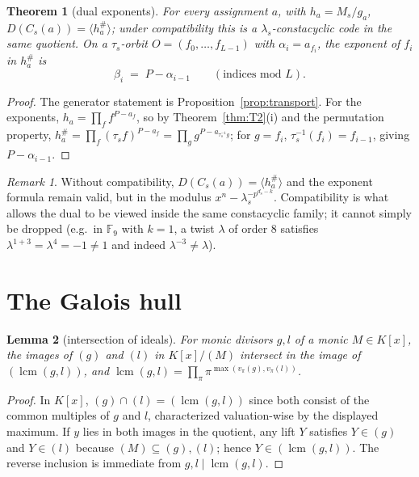 \documentclass[11pt]{article}
\newtheorem{theorem}{Theorem}[section]
\newtheorem{lemma}[theorem]{Lemma}
\theoremstyle{definition}
\theoremstyle{remark}
\newtheorem*{remark}{Remark}
\newcommand{\lcm}{\operatorname{lcm}}
\begin{document}
\begin{theorem}[dual exponents]\label{thm:T3}
For every assignment \(a\), with \(h_a = M_s / g_a\),
\(D(C_s(a)) = \langle h_a^{\#} \rangle\); under compatibility this is a
\(\lambda_s\)-constacyclic code in the same quotient. On a
\(\tau_s\)-orbit \(O = (f_0,\dots,f_{L-1})\) with \(\alpha_i = a_{f_i}\),
the exponent of \(f_i\) in \(h_a^{\#}\) is
\[
\beta_i \;=\; P - \alpha_{i-1} \qquad (\text{indices mod } L).
\]
\end{theorem}

\begin{proof}
The generator statement is Proposition~\ref{prop:transport}. For the
exponents, \(h_a = \prod_{f} f^{P - a_f}\), so by Theorem~\ref{thm:T2}(i)
and the permutation property,
\(h_a^{\#} = \prod_f (\tau_s f)^{P-a_f} = \prod_{g} g^{P - a_{\tau_s^{-1} g}}\);
for \(g = f_i\), \(\tau_s^{-1}(f_i) = f_{i-1}\), giving \(P - \alpha_{i-1}\).
\end{proof}

\begin{remark}
Without compatibility, \(D(C_s(a)) = \langle h_a^{\#}\rangle\) and the
exponent formula remain valid, but in the modulus
\(x^n - \lambda_s^{-p^{d_s-k}}\). Compatibility is what allows the dual
to be viewed inside the same constacyclic family; it cannot simply be
dropped (e.g.\ in \(\mathbb{F}_9\) with \(k=1\), a twist \(\lambda\) of
order \(8\) satisfies \(\lambda^{1+3} = \lambda^4 = -1 \ne 1\) and indeed
\(\lambda^{-3} \ne \lambda\)).
\end{remark}

\section{The Galois hull}\label{sec:hull}

\begin{lemma}[intersection of ideals]\label{lem:lcm}
For monic divisors \(g, l\) of a monic \(M \in K[x]\), the images of
\((g)\) and \((l)\) in \(K[x]/(M)\) intersect in the image of
\((\lcm(g,l))\), and
\(\lcm(g,l) = \prod_{\pi} \pi^{\max(v_\pi(g), v_\pi(l))}\).
\end{lemma}

\begin{proof}
In \(K[x]\), \((g) \cap (l) = (\lcm(g,l))\) since both consist of the
common multiples of \(g\) and \(l\), characterized valuation-wise by the
displayed maximum. If \(y\) lies in both images in the quotient, any
lift \(Y\) satisfies \(Y \in (g)\) and \(Y \in (l)\) because
\((M) \subseteq (g), (l)\); hence \(Y \in (\lcm(g,l))\). The reverse
inclusion is immediate from \(g, l \mid \lcm(g,l)\).
\end{proof}
\end{document}
